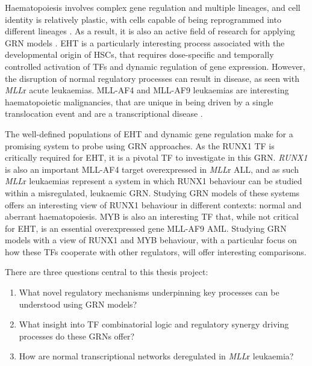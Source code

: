 Haematopoiesis involves complex gene regulation and multiple lineages, and cell identity is relatively plastic, with cells capable of being reprogrammed into different lineages \citep{schutte_experimentally_2016, riddell_reprogramming_2014, batta_direct_2014}. As a result, it is also an active field of research for applying GRN models \citep{rothenberg_how_2021}. EHT is a particularly interesting process associated with the developmental origin of HSCs, that requires dose-specific and temporally controlled activation of TFs and dynamic regulation of gene expression. However, the disruption of normal regulatory processes can result in disease, as seen with \textit{MLL}r acute leukaemias. MLL-AF4 and MLL-AF9 leukaemias are interesting haematopoietic malignancies, that are unique in being driven by a single translocation event and are a transcriptional disease \citep{andersson_landscape_2015, the_cancer_genome_atlas_research_network_genomic_2013, bardini_dna_2010, bardini_implementation_2011, rice_human_2021, krivtsov_h3k79_2008, krivtsov_cell_2013}. 

The well-defined populations of EHT and dynamic gene regulation make for a promising system to probe using GRN approaches. As the RUNX1 TF is critically required for EHT, it is a pivotal TF to investigate in this GRN. \textit{RUNX1} is also an important MLL-AF4 target overexpressed in \textit{MLL}r ALL, and as such \textit{MLL}r leukaemias represent a system in which RUNX1 behaviour can be studied within a misregulated, leukaemic GRN. Studying GRN models of these systems offers an interesting view of RUNX1 behaviour in different contexts: normal and aberrant haematopoiesis. MYB is also an interesting TF that, while not critical for EHT, is an essential overexpressed gene MLL-AF9 AML. Studying GRN models with a view of RUNX1 and MYB behaviour, with a particular focus on how these TFs cooperate with other regulators, will offer interesting comparisons.

\noindent
There are three questions central to this thesis project: 

\vspace*{-5mm}
\begin{enumerate}
    \item What novel regulatory mechanisms underpinning key processes can be understood using GRN models?
    \item What insight into TF combinatorial logic and regulatory synergy driving processes do these GRNs offer?
    \item How are normal transcriptional networks deregulated in \textit{MLL}r leukaemia?
\end{enumerate}

